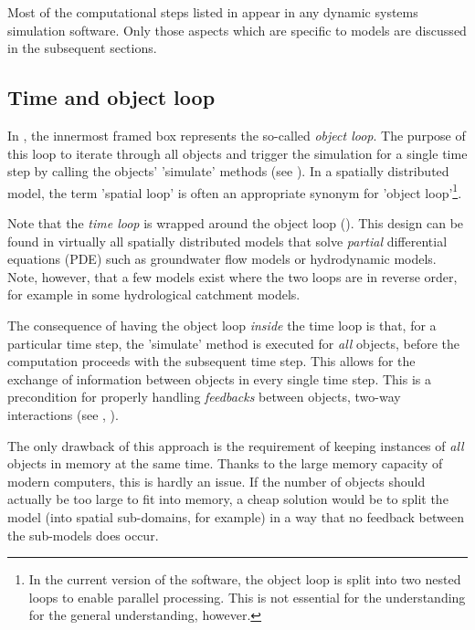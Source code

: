 Most of the computational steps listed in  appear in any dynamic systems simulation software. Only those aspects which are specific to  models are discussed in the subsequent sections.

\subsection{Time and object loop} \label{sec:concept-compSteps-loopNesting}

In , the innermost framed box represents the so-called \emph{object loop}. The purpose of this loop to iterate through all objects and trigger the simulation for a single time step by calling the objects' 'simulate' methods (see ). In a spatially distributed model, the term 'spatial loop' is often an appropriate synonym for 'object loop'\footnote{In the current version of the software, the object loop is split into two nested loops to enable parallel processing. This is not essential for the understanding for the general understanding, however.}.

Note that the \emph{time loop} is wrapped around the object loop (). This design can be found in virtually all spatially distributed models that solve \emph{partial} differential equations (PDE) such as groundwater flow models or hydrodynamic models. Note, however, that a few models exist where the two loops are in reverse order, for example in some hydrological catchment models.

The consequence of having the object loop \emph{inside} the time loop is that, for a particular time step, the 'simulate' method is executed for \emph{all} objects, before the computation proceeds with the subsequent time step. This allows for the exchange of information between objects in every single time step. This is a precondition for properly handling \emph{feedbacks} between objects, \ie{} two-way interactions (see , ).

The only drawback of this approach is the requirement of keeping instances of \emph{all} objects in memory at the same time. Thanks to the large memory capacity of modern computers, this is hardly an issue. If the number of objects should actually be too large to fit into memory, a cheap solution would be to split the model (into spatial sub-domains, for example) in a way that no feedback between the sub-models does occur.

